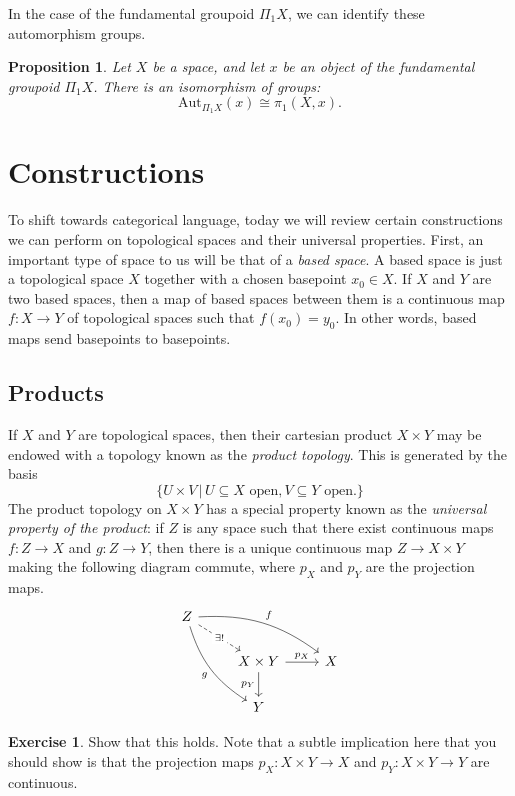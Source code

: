 \documentclass[10pt]{amsart}
\newtheorem{proposition}[thm]{Proposition}
\theoremstyle{definition}
\newtheorem{exercise}[thm]{Exercise}
\newcommand{\cdef}[1]{\textcolor{Bittersweet}{#1}}
\begin{document}
In the case of the fundamental groupoid $\Pi_1X$, we can identify these automorphism groups.

\begin{proposition}
    Let $X$ be a space, and let $x$ be an object of the fundamental groupoid $\Pi_1X$. There is an isomorphism of groups:
    \[
    \mathrm{Aut}_{\Pi_1X}(x) \cong \pi_1(X, x).
    \]
\end{proposition}


\section{Constructions}
To shift towards categorical language, today we will review certain constructions we can perform on topological spaces and their universal properties. First, an important type of space to us will be that of a \cdef{\emph{based space}}. A based space is just a topological space $X$ together with a chosen basepoint $x_0 \in X$. If $X$ and $Y$ are two based spaces, then a map of based spaces between them is a continuous map $f:X \to Y$ of topological spaces such that $f(x_0) = y_0$. In other words, based maps send basepoints to basepoints.

\subsection*{Products}
If $X$ and $Y$ are topological spaces, then their cartesian product $X \times Y$ may be endowed with a topology known as the \cdef{\emph{product topology}}. This is generated by the basis
\[\{U \times V \, | \, U \subseteq X \text{ open,}\,V \subseteq Y \text{ open.}\}\]
The product topology on $X \times Y$ has a special property known as the \emph{\cdef{universal property of the product}}: if $Z$ is any space such that there exist continuous maps $f:Z \to X$ and $g:Z \to Y$, then there is a unique continuous map $Z \to X \times Y$ making the following diagram commute, where $p_X$ and $p_Y$ are the projection maps.
\[\begin{tikzcd}
	Z \\
	& {X \times Y} & X \\
	& Y
	\arrow["{\exists!}"{description}, dashed, from=1-1, to=2-2]
	\arrow["f", bend left = 20, from=1-1, to=2-3]
	\arrow["g"', bend right = 20, from=1-1, to=3-2]
	\arrow["{p_X}", from=2-2, to=2-3]
	\arrow["{p_Y}"', from=2-2, to=3-2]
\end{tikzcd}\]    
\begin{exercise}
    Show that this holds. Note that a subtle implication here that you should show is that the projection maps $p_X:X \times Y \to X$ and $p_Y:X \times Y \to Y$ are continuous.
\end{exercise}
\end{document}
